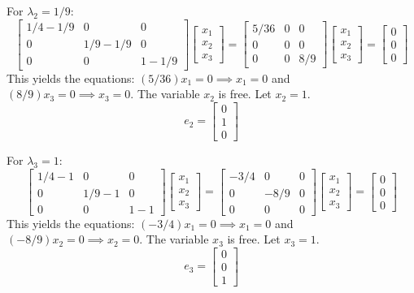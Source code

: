 \documentclass{article}
\begin{document}
For $\lambda_2 = 1/9$:
\[
\begin{bmatrix} 1/4-1/9 & 0 & 0 \\ 0 & 1/9-1/9 & 0 \\ 0 & 0 & 1-1/9 \end{bmatrix} \begin{bmatrix} x_1 \\ x_2 \\ x_3 \end{bmatrix} = \begin{bmatrix} 5/36 & 0 & 0 \\ 0 & 0 & 0 \\ 0 & 0 & 8/9 \end{bmatrix} \begin{bmatrix} x_1 \\ x_2 \\ x_3 \end{bmatrix} = \begin{bmatrix} 0 \\ 0 \\ 0 \end{bmatrix}
\]
This yields the equations: $(5/36)x_1 = 0 \implies x_1 = 0$ and $(8/9)x_3 = 0 \implies x_3 = 0$. The variable $x_2$ is free. Let $x_2 = 1$.
\[
e_2 = \begin{bmatrix} 0 \\ 1 \\ 0 \end{bmatrix}
\]

For $\lambda_3 = 1$:
\[
\begin{bmatrix} 1/4-1 & 0 & 0 \\ 0 & 1/9-1 & 0 \\ 0 & 0 & 1-1 \end{bmatrix} \begin{bmatrix} x_1 \\ x_2 \\ x_3 \end{bmatrix} = \begin{bmatrix} -3/4 & 0 & 0 \\ 0 & -8/9 & 0 \\ 0 & 0 & 0 \end{bmatrix} \begin{bmatrix} x_1 \\ x_2 \\ x_3 \end{bmatrix} = \begin{bmatrix} 0 \\ 0 \\ 0 \end{bmatrix}
\]
This yields the equations: $(-3/4)x_1 = 0 \implies x_1 = 0$ and $(-8/9)x_2 = 0 \implies x_2 = 0$. The variable $x_3$ is free. Let $x_3 = 1$.
\[
e_3 = \begin{bmatrix} 0 \\ 0 \\ 1 \end{bmatrix}
\]
\end{document}
